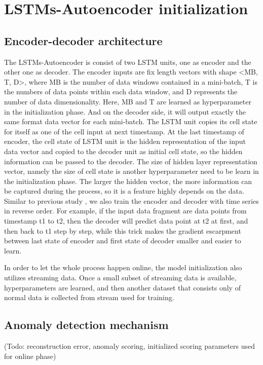 \section{LSTMs-Autoencoder initialization}
\label{sec:initialization}

\subsection{Encoder-decoder architecture}
\label{sec:Encoder-decoder architecture}

The LSTMs-Autoencoder is consist of two LSTM units, one as encoder and the other one as decoder. The encoder inputs are fix length vectors with shape <MB, T, D>, where MB is the number of data windows contained in a mini-batch, T is the numbers of data points within each data window, and D represents the number of data dimensionality. Here, MB and T are learned as hyperparameter in the initialization phase. And on the decoder side, it will output exactly the same format data vector for each mini-batch. The LSTM unit copies its cell state for itself as one of the cell input at next timestamp. At the last timestamp of encoder, the cell state of LSTM unit is the hidden representation of the input data vector and copied to the decoder unit as initial cell state, so the hidden information can be passed to the decoder. The size of hidden layer representation vector, namely the size of cell state is another hyperparameter need to be learn in the initialization phase. The larger the hidden vector, the more information can be captured during the process, so it is a feature highly depends on the data. Similar to previous study \cite{seq2seq}, we also train the encoder and decoder with time series in reverse order. For example, if the input data fragment are data points from timestamp t1 to t2, then the decoder will predict data point at t2 at first, and then back to t1 step by step, while this trick makes the gradient escarpment between last state of encoder and first state of decoder smaller and easier to learn. 

In order to let the whole process happen online, the model initialization also utilizes streaming data. Once a small subset of streaming data is available, hyperparameters are learned, and then another dataset that consists only of normal data is collected from stream used for training.

\subsection{Anomaly detection mechanism}
\label{anomalydetection}
(Todo: reconstruction error, anomaly scoring, initialized scoring parameters used for online phase)




